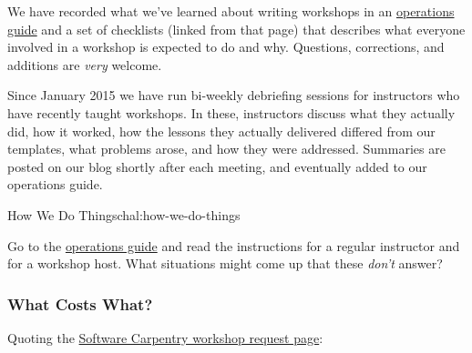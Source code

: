 We have recorded what we've learned about writing workshops in an
\href{http://software-carpentry.org/workshops/operations/}{operations
guide} and a set of checklists (linked from that page) that describes
what everyone involved in a workshop is expected to do and why.
Questions, corrections, and additions are \emph{very} welcome.

Since January 2015 we have run bi-weekly debriefing sessions for
instructors who have recently taught workshops. In these, instructors
discuss what they actually did, how it worked, how the lessons they
actually delivered differed from our templates, what problems arose, and
how they were addressed. Summaries are posted on our blog shortly after
each meeting, and eventually added to our operations guide.

\begin{challenge}{How We Do Things}{chal:how-we-do-things}

Go to the
\href{http://software-carpentry.org/workshops/operations/}{operations
guide} and read the instructions for a regular instructor and for a
workshop host. What situations might come up that these \emph{don't}
answer?
\end{challenge}

\subsubsection{What Costs What?}\label{what-costs-what}

Quoting the \href{http://software-carpentry.org/workshops/request/}{Software
Carpentry workshop request page}:

